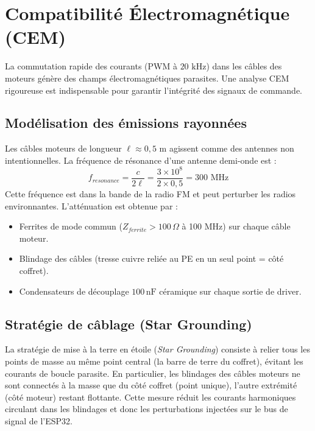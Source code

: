 \section{Compatibilité Électromagnétique (CEM)}

La commutation rapide des courants (PWM à $20\text{ kHz}$) dans les câbles des moteurs génère des champs électromagnétiques parasites. Une analyse CEM rigoureuse est indispensable pour garantir l'intégrité des signaux de commande.

\subsection{Modélisation des émissions rayonnées}

Les câbles moteurs de longueur $\ell \approx 0{,}5\text{ m}$ agissent comme des antennes non intentionnelles. La fréquence de résonance d'une antenne demi-onde est :
\begin{equation}
    f_{resonance} = \frac{c}{2\ell} = \frac{3 \times 10^8}{2 \times 0{,}5} = \boxed{300 \text{ MHz}}
\end{equation}
Cette fréquence est dans la bande de la radio FM et peut perturber les radios environnantes. L'atténuation est obtenue par :
\begin{itemize}
    \item Ferrites de mode commun ($Z_{ferrite} > 100\,\Omega$ à 100 MHz) sur chaque câble moteur.
    \item Blindage des câbles (tresse cuivre reliée au PE en un seul point = côté coffret).
    \item Condensateurs de découplage $100\,\text{nF}$ céramique sur chaque sortie de driver.
\end{itemize}

\subsection{Stratégie de câblage (Star Grounding)}
La stratégie de mise à la terre en étoile (\textit{Star Grounding}) consiste à relier tous les points de masse au même point central (la barre de terre du coffret), évitant les courants de boucle parasite. En particulier, les blindages des câbles moteurs ne sont connectés à la masse que du côté coffret (point unique), l'autre extrémité (côté moteur) restant flottante. Cette mesure réduit les courants harmoniques circulant dans les blindages et donc les perturbations injectées sur le bus de signal de l'ESP32.

